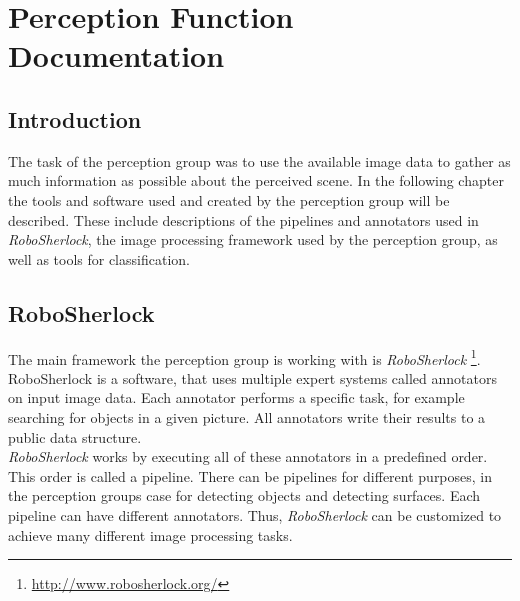 \documentclass[main.tex]{subfiles}
\begin{document}
\begingroup

\renewcommand{\cleardoublepage}{}

\renewcommand{\clearpage}{}
\newpage
\chapter{Perception Function Documentation}

\section{Introduction}
The task of the perception group was to use the available image data to gather as much information as possible about the perceived scene. In the following chapter the tools and software used and created by the perception group will be described. These include descriptions of the pipelines and annotators used in \textit{RoboSherlock}, the image processing framework used by the perception group, as well as tools for classification.

\section{RoboSherlock}
The main framework the perception group is working with is \textit{RoboSherlock} \footnote{\url{http://www.robosherlock.org/}}. RoboSherlock is a software, that uses multiple expert systems called annotators on input image data. Each annotator performs a specific task, for example searching for objects in a given picture. All annotators write their results to a public data structure.\\
		
\textit{RoboSherlock} works by executing all of these annotators in a predefined order. This order is called a pipeline. There can be pipelines for different purposes, in the perception groups case for detecting objects and detecting surfaces. Each pipeline can have different annotators. Thus, \textit{RoboSherlock} can be customized to achieve many different image processing tasks.
\end{document}
